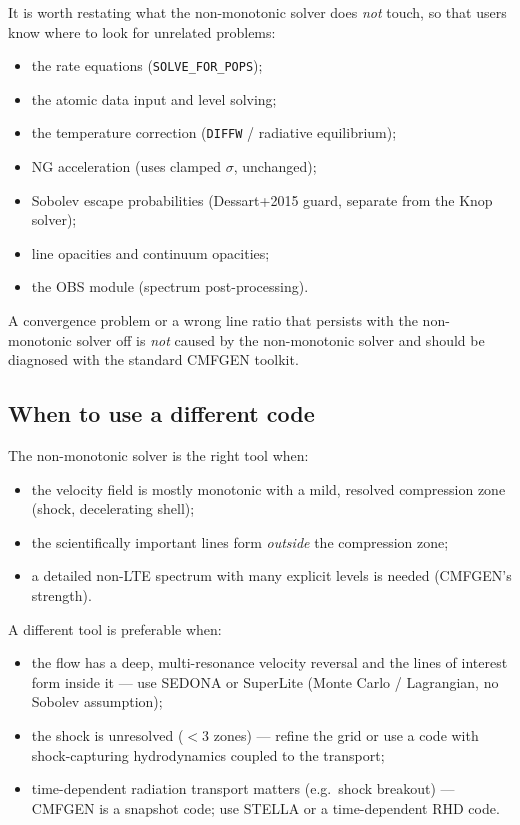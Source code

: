 \documentclass[11pt]{article}
\begin{document}
It is worth restating what the non-monotonic solver does \emph{not}
touch, so that users know where to look for unrelated problems:
\begin{itemize}[nosep]
  \item the rate equations (\texttt{SOLVE\_FOR\_POPS});
  \item the atomic data input and level solving;
  \item the temperature correction (\texttt{DIFFW} / radiative
        equilibrium);
  \item NG acceleration (uses clamped $\sigma$, unchanged);
  \item Sobolev escape probabilities (Dessart+2015 guard, separate from
        the Knop solver);
  \item line opacities and continuum opacities;
  \item the OBS module (spectrum post-processing).
\end{itemize}
A convergence problem or a wrong line ratio that persists with the
non-monotonic solver off is \emph{not} caused by the non-monotonic
solver and should be diagnosed with the standard CMFGEN toolkit.

\subsection{When to use a different code}

The non-monotonic solver is the right tool when:
\begin{itemize}[nosep]
  \item the velocity field is mostly monotonic with a mild, resolved
        compression zone (shock, decelerating shell);
  \item the scientifically important lines form \emph{outside} the
        compression zone;
  \item a detailed non-LTE spectrum with many explicit levels is needed
        (CMFGEN's strength).
\end{itemize}
A different tool is preferable when:
\begin{itemize}[nosep]
  \item the flow has a deep, multi-resonance velocity reversal and the
        lines of interest form inside it --- use SEDONA or SuperLite
        (Monte Carlo / Lagrangian, no Sobolev assumption);
  \item the shock is unresolved ($< 3$ zones) --- refine the grid or use
        a code with shock-capturing hydrodynamics coupled to the
        transport;
  \item time-dependent radiation transport matters (e.g.\ shock
        breakout) --- CMFGEN is a snapshot code; use STELLA or a
        time-dependent RHD code.
\end{itemize}
\end{document}
